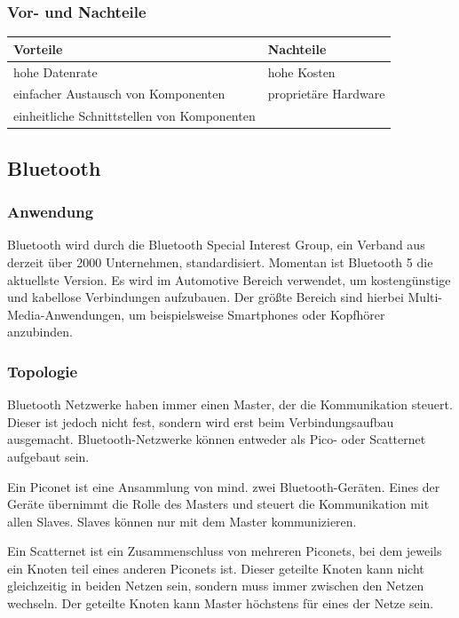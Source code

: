     \subsubsection{Vor- und Nachteile}
    \begin{center}
    \begin{tabular}{l|l}
        \textbf{Vorteile} & \textbf{Nachteile}\\
        \hline hohe Datenrate & hohe Kosten\\
        \hline einfacher Austausch von Komponenten & proprietäre Hardware\\
        \hline einheitliche Schnittstellen von Komponenten &\\
    \end{tabular}
    \end{center}
    
    \subsection{Bluetooth}		
    \subsubsection{Anwendung}
    Bluetooth wird durch die Bluetooth Special Interest Group, ein Verband aus derzeit über 2000 Unternehmen,  standardisiert. Momentan ist Bluetooth 5 die aktuellste Version. Es wird im Automotive Bereich verwendet, um kostengünstige und kabellose Verbindungen aufzubauen. Der größte Bereich sind hierbei Multi-Media-Anwendungen, um beispielsweise Smartphones oder Kopfhörer anzubinden. \cite{BP01}
    
    \subsubsection{Topologie}
    Bluetooth Netzwerke haben immer einen Master, der die Kommunikation steuert. Dieser ist jedoch nicht fest, sondern wird erst beim Verbindungsaufbau ausgemacht.
    Bluetooth-Netzwerke können entweder als Pico- oder Scatternet aufgebaut sein.
                                                                                      
    Ein Piconet ist eine Ansammlung von mind. zwei Bluetooth-Geräten. Eines der Geräte übernimmt die Rolle des Masters und steuert die Kommunikation mit allen Slaves. Slaves können nur mit dem Master kommunizieren.
    
    Ein Scatternet ist ein Zusammenschluss von mehreren Piconets, bei dem jeweils ein Knoten teil eines anderen Piconets ist. Dieser geteilte Knoten kann nicht gleichzeitig in beiden Netzen sein, sondern muss immer zwischen den Netzen wechseln. Der geteilte Knoten kann Master höchstens für eines der Netze sein.
    
